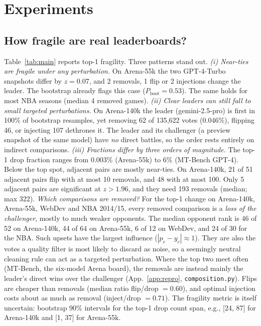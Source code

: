 \documentclass{article}
\begin{document}
\section{Experiments}

\subsection{How fragile are real leaderboards?}\label{sec:fragile}

\begin{table}[t]
\caption{Worst-case perturbations that change the top-1 competitor (refit-verified; smaller is more fragile). Boot.\ CI: 5--95\% range of the top-1 drop count over 100 bootstrap resamples. $P_{\text{boot}}$: share of resamples with the same leader. $z,R$: evidence and spread for the cheapest challenger (Eq.~\ref{eq:decomp}). $^\dagger$NBA bootstrap columns pool seasons 2005--2015.}
\label{tab:main}
\centering\scriptsize\setlength{\tabcolsep}{3pt}

\end{table}

Table~\ref{tab:main} reports top-1 fragility. Three patterns stand out. \emph{(i) Near-ties are fragile under any perturbation.} On Arena-55k the two GPT-4-Turbo snapshots differ by $z=0.07$, and 2 removals, 1 flip or 2 injections change the leader. The bootstrap already flags this case ($P_{\text{boot}}=0.53$). The same holds for most NBA seasons (median 4 removed games). \emph{(ii) Clear leaders can still fall to small targeted perturbations.} On Arena-140k the leader (gemini-2.5-pro) is first in 100\% of bootstrap resamples, yet removing 62 of 135,622 votes (0.046\%), flipping 46, or injecting 107 dethrones it. The leader and its challenger (a preview snapshot of the same model) have \emph{no} direct battles, so the order rests entirely on indirect comparisons. \emph{(iii) Fractions differ by three orders of magnitude.} The top-1 drop fraction ranges from 0.003\% (Arena-55k) to 6\% (MT-Bench GPT-4). Below the top spot, adjacent pairs are mostly near-ties. On Arena-140k, 21 of 51 adjacent pairs flip with at most 10 removals, and 48 with at most 100. Only 5 adjacent pairs are significant at $z>1.96$, and they need 193 removals (median; max 322). \emph{Which comparisons are removed?} For the top-1 change on Arena-140k, Arena-55k, WebDev and NBA 2014/15, every removed comparison is a \emph{loss of the challenger}, mostly to much weaker opponents. The median opponent rank is 46 of 52 on Arena-140k, 44 of 64 on Arena-55k, 6 of 12 on WebDev, and 24 of 30 for the NBA. Such upsets have the largest influence ($|p_c-y_c|\approx 1$). They are also the votes a quality filter is most likely to discard as noise, so a seemingly neutral cleaning rule can act as a targeted perturbation. Where the top two meet often (MT-Bench, the six-model Arena board), the removals are instead mainly the leader's direct wins over the challenger (App.~\ref{app:repro}, \texttt{composition.py}). Flips are cheaper than removals (median ratio flip/drop $=0.60$), and optimal injection costs about as much as removal (inject/drop $=0.71$). The fragility metric is itself uncertain: bootstrap 90\% intervals for the top-1 drop count span, e.g., [24, 87] for Arena-140k and [1, 37] for Arena-55k.
\end{document}
